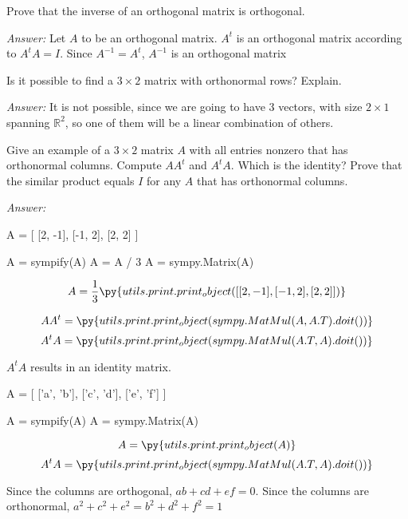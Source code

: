 \documentclass[letterpaper]{article}
\newcommand{\ans}{\textit{Answer: }}
\newenvironment{question}[2][Question]{\begin{trivlist}
\item[\hskip \labelsep {\bfseries #1}\hskip \labelsep {\bfseries #2.}]}{\end{trivlist}}
\newcommand{\printobj}[1]{\py{utils.print.print_object(#1)}}
\begin{document}
\begin{question}{6.76}
  Prove that the inverse of an orthogonal matrix is orthogonal.

  \ans Let $A$ to be an orthogonal matrix. $A^t$ is an orthogonal matrix according 
  to $A^tA = I$. Since $A^{-1} = A^t$, $A^{-1}$ is an orthogonal matrix
\end{question}

\begin{question}{6.81}
  Is it possible to find a $3 \times 2$ matrix with orthonormal rows? Explain.

  \ans It is not possible, since we are going to have 3 vectors, with size $2 \times 1$
  spanning $\mathbb{R}^{2}$, so one of them will be a linear combination of others.
\end{question}

\begin{question}{6.82}
  Give an example of a $3 \times 2$ matrix $A$ with all entries nonzero that has
  orthonormal columns. Compute $A A^{t}$ and $A^{t} A .$ Which is the identity? Prove that the
  similar product equals $I$ for any $A$ that has orthonormal columns.

  \ans 

  \begin{pycode}
A = [
  [2, -1],
  [-1, 2],
  [2, 2]
]

A = sympify(A)
A = A / 3
A = sympy.Matrix(A)
  \end{pycode}

  $$A = \frac{1}{3}\printobj{[
    [2, -1],
    [-1, 2],
    [2, 2]
  ]}$$

  $$AA^t = \printobj{sympy.MatMul(A, A.T).doit()}$$
  $$A^tA = \printobj{sympy.MatMul(A.T, A).doit()}$$

  $A^tA$ results in an identity matrix.

  \begin{pycode}
A = [
  ['a', 'b'],
  ['c', 'd'],
  ['e', 'f']
]

A = sympify(A)
A = sympy.Matrix(A)
  \end{pycode}

  $$A = \printobj{A}$$
  $$A^tA = \printobj{sympy.MatMul(A.T, A).doit()}$$

  Since the columns are orthogonal, $ab+cd+ef = 0$. Since the columns are 
  orthonormal, $a^2 + c^2 + e^2 = b^2 + d^2 + f^2 = 1$
\end{question}
\end{document}
